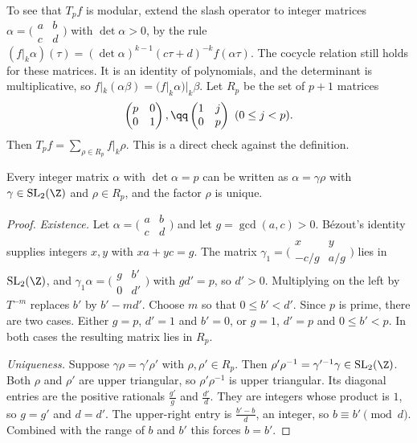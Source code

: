 To see that $T_pf$ is modular, extend the slash operator to integer matrices $\alpha=\bigl(\begin{smallmatrix}a&b\\c&d\end{smallmatrix}\bigr)$ with $\det\alpha>0$, by the rule $(f|_k\alpha)(\tau)=(\det\alpha)^{k-1}(c\tau+d)^{-k}f(\alpha\tau)$. The cocycle relation still holds for these matrices. It is an identity of polynomials, and the determinant is multiplicative, so $f|_k(\alpha\beta)=(f|_k\alpha)|_k\beta$. Let $R_p$ be the set of $p+1$ matrices
\[
\begin{pmatrix}p&0\\0&1\end{pmatrix},\qq\begin{pmatrix}1&j\\0&p\end{pmatrix}\ (0\le j<p).
\]
Then $T_pf=\sum_{\rho\in R_p}f|_k\rho$. This is a direct check against the definition.

\begin{lemma}\label{lem:hermite}
Every integer matrix $\alpha$ with $\det\alpha=p$ can be written as $\alpha=\gamma\rho$ with $\gamma\in\mathrm{SL}_2(\Z)$ and $\rho\in R_p$, and the factor $\rho$ is unique.
\end{lemma}

\begin{proof}
\emph{Existence.} Let $\alpha=\bigl(\begin{smallmatrix}a&b\\c&d\end{smallmatrix}\bigr)$ and let $g=\gcd(a,c)>0$. Bézout's identity supplies integers $x,y$ with $xa+yc=g$. The matrix $\gamma_1=\bigl(\begin{smallmatrix}x&y\\-c/g&a/g\end{smallmatrix}\bigr)$ lies in $\mathrm{SL}_2(\Z)$, and
$\gamma_1\alpha=\bigl(\begin{smallmatrix}g&b'\\0&d'\end{smallmatrix}\bigr)$ with $gd'=p$, so $d'>0$. Multiplying on the left by $T^{-m}$ replaces $b'$ by $b'-md'$. Choose $m$ so that $0\le b'<d'$. Since $p$ is prime, there are two cases. Either $g=p$, $d'=1$ and $b'=0$, or $g=1$, $d'=p$ and $0\le b'<p$. In both cases the resulting matrix lies in $R_p$.

\emph{Uniqueness.} Suppose $\gamma\rho=\gamma'\rho'$ with $\rho,\rho'\in R_p$. Then $\rho'\rho^{-1}=\gamma'^{-1}\gamma\in\mathrm{SL}_2(\Z)$. Both $\rho$ and $\rho'$ are upper triangular, so $\rho'\rho^{-1}$ is upper triangular. Its diagonal entries are the positive rationals $\frac{g'}g$ and $\frac{d'}d$. They are integers whose product is $1$, so $g=g'$ and $d=d'$. The upper-right entry is $\frac{b'-b}d$, an integer, so $b\equiv b'\pmod d$. Combined with the range of $b$ and $b'$ this forces $b=b'$.
\end{proof}

